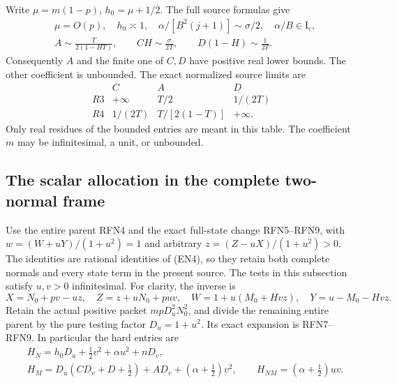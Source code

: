 Write $\mu=m(1-p)$, $h_0=\mu+1/2$. The full source formulas give
\[
\begin{aligned}
&\mu=O(p),\quad h_0\asymp1,\quad
\alpha/[B^2(j+1)]\sim\sigma/2,\quad \alpha/B\in\mathrm I_c,\\
&A\sim\frac{T}{2(1-HT)},\qquad
CH\sim\frac{\sigma}{2T},\qquad
D(1-H)\sim\frac1{2T}.
\end{aligned}                                                    \tag{EN8}
\]
Consequently $A$ and the finite one of $C,D$ have positive real
lower bounds. The other coefficient is unbounded. The exact
normalized source limits are
\[
\begin{array}{c|c|c|c}
 & C&A&D\\ \hline
R3&+\infty&T/2&1/(2T)\\
R4&1/(2T)&T/[2(1-T)]&+\infty .
\end{array}                                                    \tag{EN9}
\]
Only real residues of the bounded entries are meant in this table.
The coefficient $m$ may be infinitesimal, a unit, or unbounded.

\subsection{The scalar allocation in the complete two-normal frame}

Use the entire parent RFN4 and the exact full-state change RFN5--RFN9,
with $w=(W+uY)/(1+u^2)=1$ and arbitrary $z=(Z-uX)/(1+u^2)>0$.
The identities are rational identities of (EN4), so they retain
both complete normals and every state term in the present source.
The tests in this subsection satisfy $u,v>0$ infinitesimal.
For clarity, the inverse is
\[
X=N_0+pv-uz,\quad Z=z+uN_0+puv,\quad
W=1+u(M_0+Hvz),\quad Y=u-M_0-Hvz.                       \tag{EN10}
\]
Retain the actual positive packet $mpD_u^2N_0^2$, and divide the
remaining entire parent by the pure testing factor $D_u=1+u^2$.
Its exact expansion is RFN7--RFN9. In particular the hard entries are
\[
\begin{aligned}
&H_N=h_0D_u+\tfrac12v^2+\alpha u^2+nD_v,\\
&H_M=D_u(CD_v+D+\tfrac12)+AD_v+(\alpha+\tfrac12)v^2,\qquad
H_{NM}=(\alpha+\tfrac12)uv .
\end{aligned}                                                    \tag{EN11}
\]

